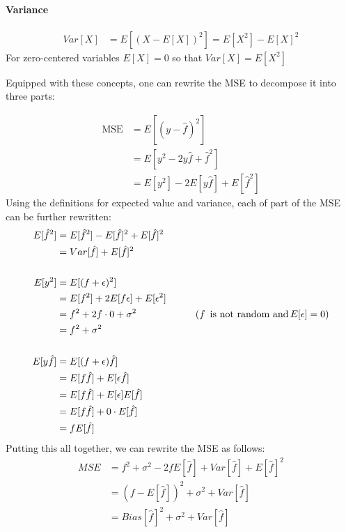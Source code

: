 \begin{tcolorbox}[colback=alert]
\paragraph*{Variance} 
\begin{align*}
Var[X] &= E[(X - E[X])^2] = E[X^2] - E[X]^2 
\end{align*}
For zero-centered variables $E[X] = 0$ so that $Var[X] = E[X^2]$
\end{tcolorbox}

Equipped with these concepts, one can rewrite the MSE to decompose it into three parts:

\begin{align*}
\operatorname{MSE} &= E[(y - \hat{f})^2] \\
    & = E [ y^2 - 2 y \hat{f} + \hat{f}^2] \\
    &= E [y^2] - 2E[y\hat{f}] + E[\hat{f}^2]
\end{align*}
\noindent Using the definitions for expected value and variance, each of part of the MSE can be further rewritten:
\begin{align*}
E[\hat{f}^2] &= E[\hat{f}^2] - E[\hat{f}]^2 + E[\hat{f}]^2 \\
             &= Var[\hat{f}] + E[\hat{f}]^2 \\
\\
E[y^2] &= E[(f+\epsilon)^2] \\
       &= E[f^2] + 2E[f \epsilon] + E[\epsilon^2]\\
       &= f^2 + 2f \cdot 0 + \sigma^2 &\qquad (f \text{\, is not random and} \, E[\epsilon] = 0)\\
       &= f^2 + \sigma^2 \\ 
\\
E[y \hat{f}] &= E[(f + \epsilon)\hat{f}] \\
             &= E[f \hat{f}] + E[\epsilon \hat{f}] \\
             &= E[f \hat{f}] + E[\epsilon] E[\hat{f}] \\
             &= E[f \hat{f}] + 0 \cdot E[\hat{f}] \\
             &= f E[\hat{f}] \\
\end{align*}
\noindent Putting this all together, we can rewrite the MSE as follows:
\begin{align*}
MSE &= f^2 + \sigma^2 - 2 f E[\hat{f}] + Var[\hat{f}] + E[\hat{f}]^2 \\
    &= (f - E[\hat{f}])^2 + \sigma^2 + Var[\hat{f}] \\
    &= Bias[\hat{f}]^2 + \sigma^2 + Var[\hat{f}] \\
\end{align*}

